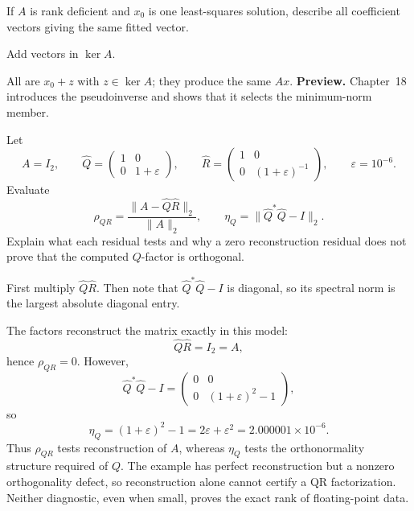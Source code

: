 \begin{exercise}\label{exr:i14-expand-16}
If \(A\) is rank deficient and \(x_0\) is one least-squares solution, describe all coefficient vectors giving the same fitted vector.
\end{exercise}
\begin{hint}
Add vectors in \(\ker A\).
\end{hint}
\begin{solution}
All are \(x_0+z\) with \(z\in\ker A\); they produce the same \(Ax\). \textbf{Preview.} Chapter~18 introduces the pseudoinverse and shows that it selects the minimum-norm member.
\end{solution}
\begin{exercise}\label{exr:i14-numerical-qr-01}
Let
\[
A=I_2,\qquad
\widehat Q=
\begin{pmatrix}
1&0\\
0&1+\varepsilon
\end{pmatrix},
\qquad
\widehat R=
\begin{pmatrix}
1&0\\
0&(1+\varepsilon)^{-1}
\end{pmatrix},
\qquad
\varepsilon=10^{-6}.
\]
Evaluate
\[
\rho_{QR}
=
\frac{\|A-\widehat Q\widehat R\|_2}{\|A\|_2},
\qquad
\eta_Q
=
\|\widehat Q^*\widehat Q-I\|_2.
\]
Explain what each residual tests and why a zero reconstruction residual does
not prove that the computed \(Q\)-factor is orthogonal.
\end{exercise}
\begin{hint}
First multiply \(\widehat Q\widehat R\).  Then note that
\(\widehat Q^*\widehat Q-I\) is diagonal, so its spectral norm is the largest
absolute diagonal entry.
\end{hint}
\begin{solution}
The factors reconstruct the matrix exactly in this model:
\[
\widehat Q\widehat R=I_2=A,
\]
hence \(\rho_{QR}=0\).  However,
\[
\widehat Q^*\widehat Q-I
=
\begin{pmatrix}
0&0\\
0&(1+\varepsilon)^2-1
\end{pmatrix},
\]
so
\[
\eta_Q=(1+\varepsilon)^2-1
=2\varepsilon+\varepsilon^2
=2.000001\times10^{-6}.
\]
Thus \(\rho_{QR}\) tests reconstruction of \(A\), whereas \(\eta_Q\) tests the
orthonormality structure required of \(Q\).  The example has perfect
reconstruction but a nonzero orthogonality defect, so reconstruction alone
cannot certify a QR factorization.  Neither diagnostic, even when small, proves
the exact rank of floating-point data.
\end{solution}
